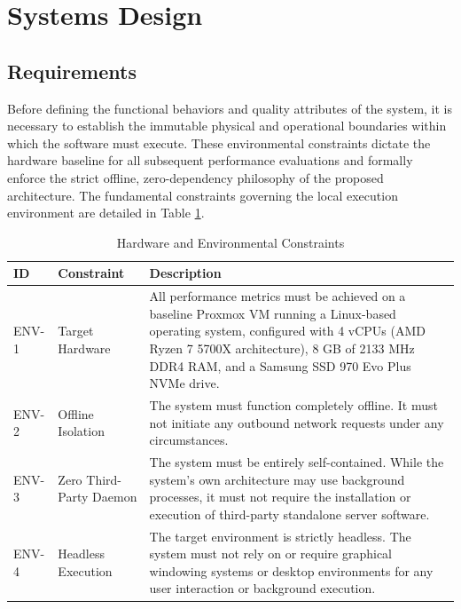 \section{Systems Design}\label{sec:design_and_decision}

\subsection{Requirements}

Before defining the functional behaviors and quality attributes of the system, it is necessary to establish the immutable physical and operational boundaries within which the software must execute. These environmental constraints dictate the hardware baseline for all subsequent performance evaluations and formally enforce the strict offline, zero-dependency philosophy of the proposed architecture. The fundamental constraints governing the local execution environment are detailed in Table \ref{tab:env_constraints}.

\FloatBarrier
\begin{table}[htbp]
    \centering
    \caption{Hardware and Environmental Constraints}
    \label{tab:env_constraints}
    \renewcommand{\arraystretch}{1.3} %
    \begin{tabularx}{\textwidth}{@{} l l X @{}}
        \toprule
        \textbf{ID} & \textbf{Constraint} & \textbf{Description} \\
        \midrule
        ENV-1 & Target Hardware & All performance metrics must be achieved on a baseline Proxmox \ac{VM} running a Linux-based operating system, configured with 4 vCPUs (AMD Ryzen 7 5700X architecture), 8 GB of 2133 MHz DDR4 RAM, and a Samsung SSD 970 Evo Plus NVMe drive. \\
        ENV-2 & Offline Isolation & The system must function completely offline. It must not initiate any outbound network requests under any circumstances. \\
        ENV-3 & Zero Third-Party Daemon & The system must be entirely self-contained. While the system's own architecture may use background processes, it must not require the installation or execution of third-party standalone server software. \\
        ENV-4 & Headless Execution & The target environment is strictly headless. The system must not rely on or require graphical windowing systems or desktop environments for any user interaction or background execution. \\
        \bottomrule
    \end{tabularx}
\end{table}

